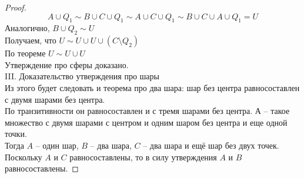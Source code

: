 \begin{theorem}
\begin{proof}
        $$
            A \cup Q_1 \sim B \cup C \cup Q_1 \sim A \cup C \cup Q_1 \sim B \cup C \cup A \cup Q_1 = U
        $$
        Аналогично, $B \cup Q_2 \sim U$\\
        Получаем, что $U \sim U \cup U \cup (C \setminus Q_2)$\\
        По теореме $U \sim U \cup U$\\
        
        Утверждение про сферы доказано.\\
        
        III. Доказательство утверждения про шары\\
        
        
        Из этого будет следовать и теорема про два шара: шар без центра равносоставлен с двумя шарами без центра.\\
        
        По транзитивности он равносоставлен и с тремя шарами без центра. $А$ -- такое множество с двумя шарами с центром  и одним шаром без центра и еще одной точки.\\
        
        Тогда $A$ -- один шар, $B$ -- два шара, $C$ -- два шара и ещё шар без двух точек.\\
        
        Поскольку $A$ и $C$ равносоставлены, то в силу утверждения $A$ и $B$ равносоставлены.
    \end{proof}
    
\end{theorem}